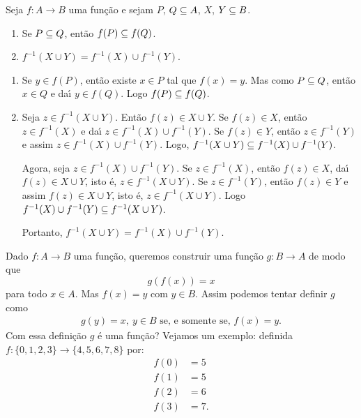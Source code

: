 \begin{proposicao}
	Seja $f : A \to B$ uma fun{\c c}{\~a}o e sejam $P$, $Q \subseteq A$, $X$, $Y \subseteq B$.
	\begin{enumerate}[label={\roman*})]
		\item Se $P \subseteq Q$, ent{\~a}o $f(P) \subseteq f(Q)$.

		\item $f^{-1}(X \cup Y) = f^{-1}(X) \cup f^{-1}(Y)$.
	\end{enumerate}
\end{proposicao}
\begin{prova}
	\begin{enumerate}[label={\roman*})]
		\item Se $y \in f(P)$, ent{\~a}o existe $x \in P$ tal que $f(x) = y$. Mas como $P \subseteq Q$, ent{\~a}o $x \in Q$ e da{\'\i} $y \in f(Q)$. Logo $f(P) \subseteq f(Q)$.

		\item Seja $z \in f^{-1}(X \cup Y)$. Ent{\~a}o $f(z) \in X \cup Y$. Se $f(z) \in X$, ent\~ao $z \in f^{-1}(X)$ e da{\'\i} $z \in f^{-1}(X) \cup f^{-1}(Y)$. Se $f(z) \in Y$, ent{\~a}o $z \in f^{-1}(Y)$ e assim $z \in f^{-1}(X) \cup f^{-1}(Y)$. Logo, $f^{-1}(X \cup Y) \subseteq f^{-1}(X) \cup f^{-1}(Y)$.

		Agora, seja $z \in f^{-1}(X) \cup f^{-1}(Y)$. Se $z \in f^{-1}(X)$, ent{\~a}o $f(z) \in X$, da{\'\i} $f(z) \in X \cup Y$, isto {\'e}, $z \in f^{-1}(X \cup Y)$. Se $z \in f^{-1}(Y)$, ent{\~a}o $f(z) \in Y$ e assim $f(z) \in X \cup Y$, isto {\'e}, $z \in f^{-1}(X \cup Y)$. Logo $f^{-1}(X) \cup f^{-1}(Y) \subseteq f^{-1}(X \cup Y)$.

		Portanto, $f^{-1}(X \cup Y) = f^{-1}(X) \cup f^{-1}(Y)$.
	\end{enumerate}
\end{prova}


Dado $f : A \to B$ uma fun\c{c}{\~a}o, queremos construir uma fun\c{c}\~ao $g : B \to A$ de modo que
\[
	g(f(x)) = x
\]
para todo $x \in A$. Mas $f(x) = y$ com $y \in B$. Assim podemos tentar definir $g$ como
\begin{align}\label{condicao_funcao_inversa}
	g(y) = x,\ y \in B \mbox{ se, e somente se, } f(x) = y.
\end{align}
Com essa defini\c{c}\~ao $g$ \'e uma fun\c{c}\~ao? Vejamos um exemplo: definida $f : \{0,1,2,3\} \to \{4,5,6,7,8\}$ por:
\begin{align*}
	f(0) &= 5\\
	f(1) &= 5\\
	f(2) &= 6\\
	f(3) &= 7.
\end{align*}

